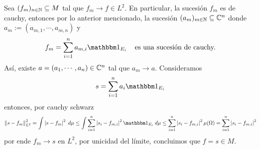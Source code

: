 \documentclass{article}
\begin{document}
\begin{enumerate}
    Sea $(f_{m})_{n\in\mathbb{N}}\subseteq M$ tal que $f_{m}\to f\in L^{2}$. En particular, la sucesión 
    $f_{m}$ es de cauchy, entonces por lo anterior mencionado, la sucesión $(a_{m})_{m\in\mathbb{N}}
    \subseteq\mathbb{C}^{n}$ donde $a_{m}:=(a_{m,1},\cdots,a_{m,n})$ y
    \begin{equation*}
        f_{m}=\sum_{i=1}^{n}a_{m,i}\I_{E_{i}}\hspace{4mm}\text{es una sucesión de cauchy.}
    \end{equation*}
    Así, existe $a=(a_{1},\cdots,a_{n})\in\mathbb{C}^{n}$ tal que $a_{m}\to a$. Consideramos
    \begin{equation*}
        s=\sum_{i=1}^{n}a_{i}\I_{E_{i}}
    \end{equation*}
    entonces, por cauchy schwarz
    \begin{equation*}
        \norm{s-f_{m}}_{L^{2}}^{2}=\int\abs{s-f_{m}}^{2}\hspace{1mm}d\mu
        \leq\int\sum_{i=1}^{n}\abs{s_{i}-f_{m,i}}^{2}\I_{E_{i}}\hspace{1mm}d\mu
        \leq\sum_{i=1}^{n}\abs{s_{i}-f_{m,i}}^{2}\mu(\Omega)=\sum_{i=1}^{n}\abs{s_{i}-f_{m,i}}^{2}
    \end{equation*}
    por ende $f_{m}\to s$ en $L^{2}$, por unicidad del límite, concluimos que $f=s\in M$.
    

\end{enumerate}
\end{document}
